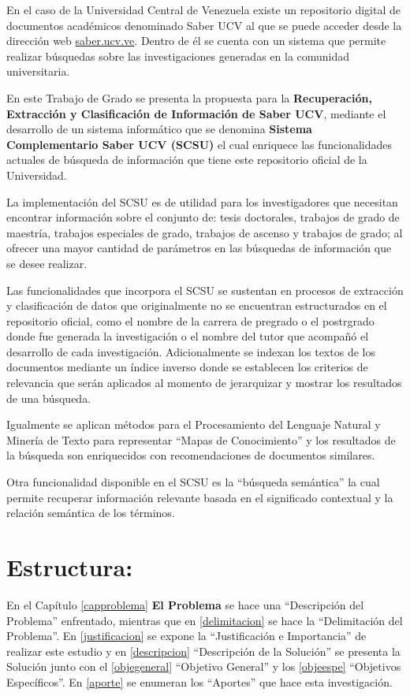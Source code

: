 \documentclass[
  12pt,
  openany]{book}
\begin{document}
En el caso de la Universidad Central de Venezuela existe un repositorio digital de documentos académicos denominado Saber UCV al que se puede acceder desde la dirección web \href{http://saber.ucv.ve/}{saber.ucv.ve}. Dentro de él se cuenta con un sistema que permite realizar búsquedas sobre las investigaciones generadas en la comunidad universitaria.

En este Trabajo de Grado se presenta la propuesta para la \textbf{Recuperación, Extracción y Clasificación de Información de Saber UCV}, mediante el desarrollo de un sistema informático que se denomina \textbf{Sistema Complementario Saber UCV (SCSU)} el cual enriquece las funcionalidades actuales de búsqueda de información que tiene este repositorio oficial de la Universidad.

La implementación del SCSU es de utilidad para los investigadores que necesitan encontrar información sobre el conjunto de: tesis doctorales, trabajos de grado de maestría, trabajos especiales de grado, trabajos de ascenso y trabajos de grado; al ofrecer una mayor cantidad de parámetros en las búsquedas de información que se desee realizar.

Las funcionalidades que incorpora el SCSU se sustentan en procesos de extracción y clasificación de datos que originalmente no se encuentran estructurados en el repositorio oficial, como el nombre de la carrera de pregrado o el postrgrado donde fue generada la investigación o el nombre del tutor que acompañó el desarrollo de cada investigación. Adicionalmente se indexan los textos de los documentos mediante un índice inverso donde se establecen los criterios de relevancia que serán aplicados al momento de jerarquizar y mostrar los resultados de una búsqueda.

Igualmente se aplican métodos para el Procesamiento del Lenguaje Natural y Minería de Texto para representar ``Mapas de Conocimiento'' \citep{dueñas2011} y los resultados de la búsqueda son enriquecidos con recomendaciones de documentos similares.

Otra funcionalidad disponible en el SCSU es la ``búsqueda semántica'' la cual permite recuperar información relevante basada en el significado contextual y la relación semántica de los términos.

\hypertarget{estructura}{%
\section{Estructura:}\label{estructura}}

En el Capítulo \ref{capproblema} \textbf{El Problema} se hace una ``Descripción del Problema'' enfrentado, mientras que en \ref{delimitacion} se hace la ``Delimitación del Problema''. En \ref{justificacion} se expone la ``Justificación e Importancia'' de realizar este estudio y en \ref{descripcion} ``Descripción de la Solución'' se presenta la Solución junto con el \ref{objegeneral} ``Objetivo General'' y los \ref{objeespe} ``Objetivos Específicos''. En \ref{aporte} se enumeran los ``Aportes'' que hace esta investigación.
\end{document}
